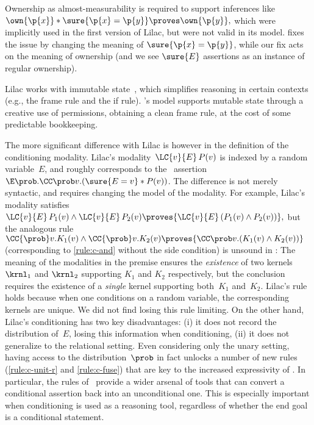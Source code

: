Ownership as almost-measurability is required to support inferences like
$
  \own{\p{x}} * \sure{\p{x}=\p{y}}
  \proves
  \own{\p{y}},
$
which were implicitly used in the first version of Lilac,
but were not valid in its model.
\citet{lilac2} fixes the issue by changing the meaning of $\sure{\p{x}=\p{y}}$,
while our fix acts on the meaning of ownership
(and we see $\sure{E}$ assertions as an instance of regular ownership).

Lilac works with
immutable state~\cite{staton2020},
which simplifies reasoning in certain contexts
(e.g., the frame rule and the if rule).
\thelogic's model supports mutable state through a creative use of permissions,
obtaining a clean frame rule, at the cost of some predictable bookkeeping.

The more significant difference with Lilac is however in the definition of the conditioning modality.
Lilac's modality~$\LC{v}{E}\,P(v)$ is indexed by a random variable~$E$,
and roughly corresponds to the \thelogic\ assertion
$ \E \prob. \CC \prob v.(\sure{E=v} * P(v)) $.
The difference is not merely syntactic,
and requires changing the model of the modality.
For example, Lilac's modality satisfies
$
  {\LC{v}{E}\,P_1(v) \land \LC{v}{E}\,P_2(v)}
  \proves
  {\LC{v}{E}\,(P_1(v) \land P_2(v))},
$
but the analogous rule
$
  {\CC{\prob} v. K_1(v)
    \land
  \CC{\prob} v. K_2(v)}
  \proves
  {\CC\prob v.
    (K_1(v) \land K_2(v))}
$
(corresponding to \ref{rule:c-and} without the side condition)
is unsound in \thelogic:
The meaning of the modalities in the premise ensures
the \emph{existence} of two kernels $\krnl_1$ and $\krnl_2$ supporting
$K_1$ and $K_2$ respectively,
but the conclusion requires the existence of a \emph{single} kernel
supporting both~$K_1$ and~$K_2$.
Lilac's rule holds because when one conditions on a random variable,
the corresponding kernels are unique.
We did not find losing this rule limiting.
On the other hand,
Lilac's conditioning has two key disadvantages:
(i)  it does not record the distribution of~$E$,
     losing this information when conditioning,
(ii) it does not generalize to the relational setting.
Even considering only the unary setting,
having access to the distribution~$\prob$ in fact unlocks a number of new
rules (\eg \ref{rule:c-unit-r} and \ref{rule:c-fuse})
that are key to the increased expressivity of \thelogic.
In particular, the rules of \thelogic\ provide a wider arsenal of tools
that can convert a conditional assertion back into an unconditional one.
This is especially important when conditioning is used as a reasoning tool,
regardless of whether the end goal is a conditional statement.






